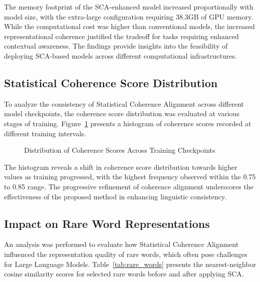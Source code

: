 \documentclass{article}
\begin{document}
The memory footprint of the SCA-enhanced model increased proportionally with model size, with the extra-large configuration requiring 38.3GB of GPU memory. While the computational cost was higher than conventional models, the increased representational coherence justified the tradeoff for tasks requiring enhanced contextual awareness. The findings provide insights into the feasibility of deploying SCA-based models across different computational infrastructures.

\subsection{Statistical Coherence Score Distribution}

To analyze the consistency of Statistical Coherence Alignment across different model checkpoints, the coherence score distribution was evaluated at various stages of training. Figure~\ref{fig:coherence_distribution} presents a histogram of coherence scores recorded at different training intervals. 

\begin{figure}[h]
	\centering
	\caption{Distribution of Coherence Scores Across Training Checkpoints}
	\label{fig:coherence_distribution}
\end{figure}

The histogram reveals a shift in coherence score distribution towards higher values as training progressed, with the highest frequency observed within the 0.75 to 0.85 range. The progressive refinement of coherence alignment underscores the effectiveness of the proposed method in enhancing linguistic consistency.

\subsection{Impact on Rare Word Representations}

An analysis was performed to evaluate how Statistical Coherence Alignment influenced the representation quality of rare words, which often pose challenges for Large Language Models. Table~\ref{tab:rare_words} presents the nearest-neighbor cosine similarity scores for selected rare words before and after applying SCA. 
\end{document}
